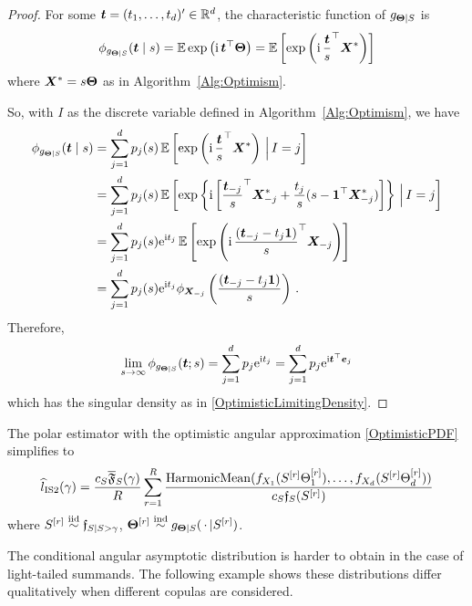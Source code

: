 \begin{proof}
For some $\bm{t}=(t_1,\dots,t_d)' \in \mathbb{R}^d$, the characteristic function of $g_{\bm{\Theta} \mid  S}$ is
\[
\phi_{g_{\bm{\Theta} \mid  S}}(\bm{t} \mid s)
= \operatorname{{\mathbb E}} \exp\left(\mathrm{i}\,\bm{t}^\top \bm{\Theta} \right)
= \operatorname{{\mathbb E}} \left[ \exp\left(\mathrm{i}\,\frac{\bm{t}}{s}^\top \bm{X}^* \right) \right]
\]
where $\bm{X}^* = s \bm{\Theta}$ as in Algorithm~\ref{Alg:Optimism}.

So, with $I$ as the discrete variable defined in Algorithm~\ref{Alg:Optimism}, we have
\begin{align*}
\phi_{g_{\bm{\Theta} \mid  S}}(\bm{t} \mid s)
&= \sum_{j=1}^d p_j(s) \operatorname{{\mathbb E}} \left[ \exp\left(\mathrm{i}\,\frac{\bm{t}}{s}^\top \bm{X}^* \right) \,\Big|\, I = j \right] \\
&= \sum_{j=1}^d p_j(s) \operatorname{{\mathbb E}} \left[ \exp \left\{ \mathrm{i} \left[ \frac{\bm{t}_{-j}}{s}^\top \bm{X}^*_{-j} + \frac{t_j}{s} (s - \bm{1}^\top \bm{X}^*_{-j}) \right] \right\}  \,\Big|\, I = j \right] \\
&= \sum_{j=1}^d p_j(s) \mathrm{e}^{\mathrm{i} t_j} \operatorname{{\mathbb E}} \left[ \exp\left(\mathrm{i}\,\frac{(\bm{t}_{-j} - t_j \bm{1})}{s}^\top \bm{X}_{-j} \right)  \right] \\
&= \sum_{j=1}^d p_j(s) \mathrm{e}^{\mathrm{i} t_j} \phi_{\bm{X}_{-j}} \left(  \frac{(\bm{t}_{-j} - t_j \bm{1})}{s} \right) \,.
\end{align*}
Therefore,
\[
\lim_{s \to \infty} \phi_{g_{\bm{\Theta} | S}}(\bm{t} ; s)
= \sum_{j=1}^d p_j \mathrm{e}^{\mathrm{i} t_j}
= \sum_{j=1}^d p_j \mathrm{e}^{\mathrm{i} \bm{t}^\top \bm{e}_j}
\]
which has the singular density as in \eqref{OptimisticLimitingDensity}.
\end{proof}

\begin{remark}
The polar estimator with the optimistic angular approximation \eqref{OptimisticPDF} simplifies to
\[
\widehat{l}_{\mathrm{IS2}}(\gamma)
= \frac{c_S \overline{\mathfrak{F}}_S(\gamma)}{R} \sum_{r=1}^R \frac{\mathrm{HarmonicMean}( f_{X_1}( S^{[r]} \Theta^{[r]}_1), \dots, f_{X_d}( S^{[r]} \Theta^{[r]}_d) )}{c_S \mathfrak{f}_S( S^{[r]} )}
\]
where $S^{[r]} \overset{\smash{\mathrm{iid}}}{\sim} \mathfrak{f}_{S|S>\gamma}$, $\bm{\Theta}^{[r]} \overset{\smash{\mathrm{ind}}}{\sim} g_{\bm{\Theta} \mid S}( \,\cdot\, | S^{[r]})$. \remQED
\end{remark}

The conditional angular asymptotic distribution is harder to obtain in the case of light-tailed summands. The following example shows these distributions differ qualitatively when different copulas are considered.

